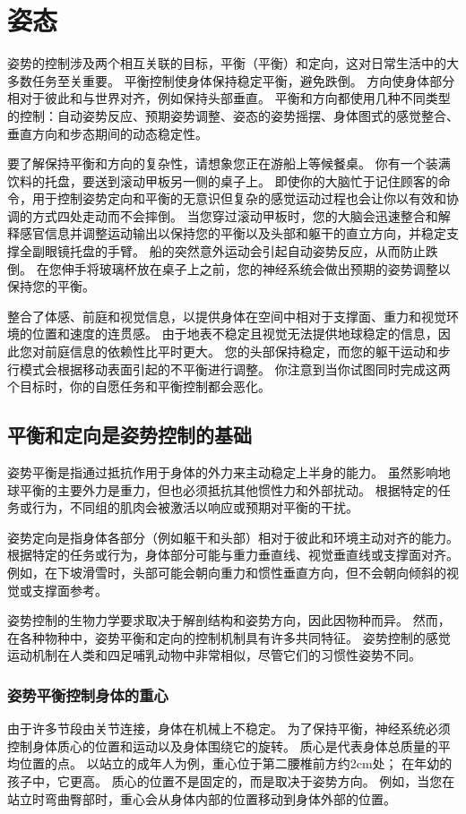 \chapter{姿态} \label{chap:chap36}
姿势的控制涉及两个相互关联的目标，平衡（平衡）和定向，这对日常生活中的大多数任务至关重要。 平衡控制使身体保持稳定平衡，避免跌倒。 方向使身体部分相对于彼此和与世界对齐，例如保持头部垂直。 平衡和方向都使用几种不同类型的控制：自动姿势反应、预期姿势调整、姿态的姿势摇摆、身体图式的感觉整合、垂直方向和步态期间的动态稳定性。

要了解保持平衡和方向的复杂性，请想象您正在游船上等候餐桌。 你有一个装满饮料的托盘，要送到滚动甲板另一侧的桌子上。 即使你的大脑忙于记住顾客的命令，用于控制姿势定向和平衡的无意识但复杂的感觉运动过程也会让你以有效和协调的方式四处走动而不会摔倒。 当您穿过滚动甲板时，您的大脑会迅速整合和解释感官信息并调整运动输出以保持您的平衡以及头部和躯干的直立方向，并稳定支撑全副眼镜托盘的手臂。 船的突然意外运动会引起自动姿势反应，从而防止跌倒。 在您伸手将玻璃杯放在桌子上之前，您的神经系统会做出预期的姿势调整以保持您的平衡。

整合了体感、前庭和视觉信息，以提供身体在空间中相对于支撑面、重力和视觉环境的位置和速度的连贯感。 由于地表不稳定且视觉无法提供地球稳定的信息，因此您对前庭信息的依赖性比平时更大。 您的头部保持稳定，而您的躯干运动和步行模式会根据移动表面引起的不平衡进行调整。 你注意到当你试图同时完成这两个目标时，你的自愿任务和平衡控制都会恶化。

\section{平衡和定向是姿势控制的基础}
姿势平衡是指通过抵抗作用于身体的外力来主动稳定上半身的能力。 虽然影响地球平衡的主要外力是重力，但也必须抵抗其他惯性力和外部扰动。 根据特定的任务或行为，不同组的肌肉会被激活以响应或预期对平衡的干扰。

姿势定向是指身体各部分（例如躯干和头部）相对于彼此和环境主动对齐的能力。 根据特定的任务或行为，身体部分可能与重力垂直线、视觉垂直线或支撑面对齐。 例如，在下坡滑雪时，头部可能会朝向重力和惯性垂直方向，但不会朝向倾斜的视觉或支撑面参考。

姿势控制的生物力学要求取决于解剖结构和姿势方向，因此因物种而异。 然而，在各种物种中，姿势平衡和定向的控制机制具有许多共同特征。 姿势控制的感觉运动机制在人类和四足哺乳动物中非常相似，尽管它们的习惯性姿势不同。


\subsection{姿势平衡控制身体的重心}
由于许多节段由关节连接，身体在机械上不稳定。 为了保持平衡，神经系统必须控制身体质心的位置和运动以及身体围绕它的旋转。 质心是代表身体总质量的平均位置的点。 以站立的成年人为例，重心位于第二腰椎前方约2cm处； 在年幼的孩子中，它更高。 质心的位置不是固定的，而是取决于姿势方向。 例如，当您在站立时弯曲臀部时，重心会从身体内部的位置移动到身体外部的位置。

